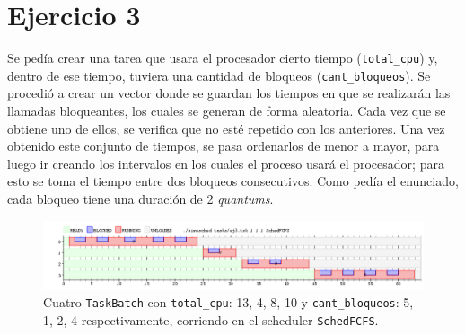 \section{Ejercicio 3}
	Se pedía crear una tarea que usara el procesador cierto tiempo
	(\texttt{total\_cpu}) y, dentro de ese tiempo, tuviera una cantidad de
	bloqueos (\texttt{cant\_bloqueos}). Se procedió a crear un vector donde se
	guardan los tiempos en que se realizarán las llamadas bloqueantes, los
	cuales se generan de forma aleatoria. Cada vez que se obtiene uno de ellos,
	se verifica que no esté repetido con los anteriores. Una vez obtenido este
	conjunto de tiempos, se pasa ordenarlos de menor a mayor, para luego ir
	creando los intervalos en los cuales el proceso usará el procesador; para
	esto se toma el tiempo entre dos bloqueos consecutivos. Como pedía el
	enunciado, cada bloqueo tiene una duración de 2 \emph{quantums}.

	\begin{figure}[ht]
		\begin{center}
			\includegraphics[width=1\columnwidth]{imagenes/ej3.png}
			\caption{Cuatro \texttt{TaskBatch} con \texttt{total\_cpu}: 13, 4, 8, 10 y
				\texttt{cant\_bloqueos}: 5, 1, 2, 4 respectivamente, corriendo en el scheduler \texttt{SchedFCFS}.}
		\end{center}
	\end{figure}

